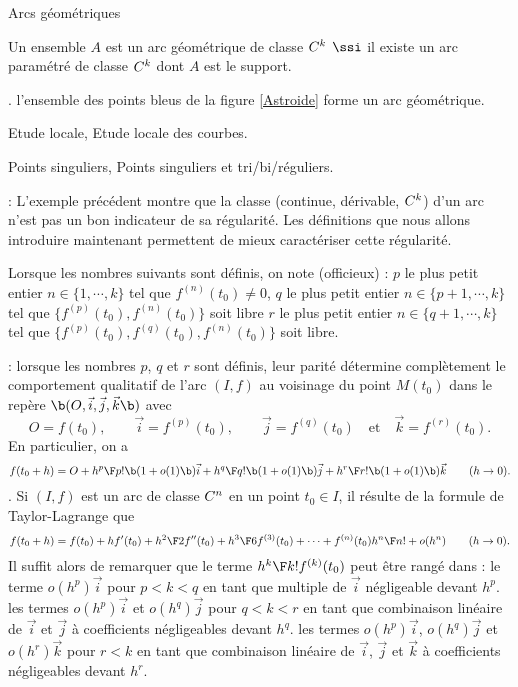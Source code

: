 \Concept Arcs g\'eom\'etriques

Un ensemble $A$ est un arc g\'eom\'etrique de classe $\sc C^k$ $\ssi$ il existe un arc param\'etr\'e de classe $\sc C^k$ dont $A$ est le support. 
\bigskip

\Exemple. l'ensemble des points bleus de la figure \ref{Astroide} forme un arc g\'eom\'etrique. 

\Section Etude locale, Etude locale des courbes. 

\Subsection Points singuliers, Points singuliers et tri/bi/r\'eguliers.

\Remarque : L'exemple pr\'ec\'edent montre que la classe (continue, d\'erivable, $\sc C^k$) d'un arc n'est pas un bon indicateur de sa r\'egularit\'e. 
Les d\'efinitions que nous allons introduire maintenant permettent de mieux caract\'eriser cette r\'egularit\'e. 
\bigskip

Lorsque les nombres suivants sont d\'efinis, on note (officieux) : \medskip\noindent
$p$ le plus petit entier $n\in\{1,\cdots, k\}$ tel que $f^{(n)}(t_0)\neq 0$, 
\medskip
\noindent 
$q$ le plus petit entier $n\in\{p+1,\cdots,k\}$ tel que $\{f^{(p)}(t_0),f^{(n)}(t_0)\}$ soit libre 
\medskip
\noindent 
$r$ le plus petit entier $n\in\{q+1,\cdots,k\}$ tel que $\{f^{(p)}(t_0),f^{(q)}(t_0),f^{(n)}(t_0)\}$ soit libre. 

\Remarque : lorsque les nombres $p$, $q$ et $r$ sont d\'efinis, leur parit\'e d\'etermine compl\`etement le comportement qualitatif de l'arc $(I,f)$ au voisinage du point $M(t_0)$ dans le rep\`ere $\b(O,\vec i,\vec j,\vec k\b)$ avec 
$$ 
O=f(t_0), \qquad \vec i=f^{(p)}(t_0), \qquad\vec j=f^{(q)}(t_0)\quad\mbox{et}\quad\vec k=f^{(r)}(t_0).
$$ 
En particulier, on a 
$$
f(t_0+h)=O+{h^p\F p!}\b(1+o(1)\b)\vec i+{h^q\F q!}\b(1+o(1)\b)\vec j
+{h^r\F r!}\b(1+o(1)\b)\vec k\qquad(h\to0).
$$ 
\Demonstration. Si $(I,f)$ est un arc de classe $\sc C^n$ en un point $t_0\in I$, il r\'esulte de la formule de Taylor-Lagrange que 
$$
f(t_0+h)=f(t_0)+hf'(t_0)+{h^2\F2}f''(t_0)+{h^3\F6}f^{(3)}(t_0)+\cdots+f^{(n)}(t_0){h^n\F n!}+o(h^n)\qquad(h\to0). 
$$
Il suffit alors de remarquer que le terme ${h^k\F k!}f^{(k)}(t_0)$ peut \^etre rang\'e dans : \smallskip\noindent
le terme $o(h^p)\vec i$ pour $p<k<q$ en tant que multiple de $\vec i$ n\'egligeable devant $h^p$. \smallskip\noindent
les termes $o(h^p)\vec i$ et $o(h^q)\vec j$ pour $q<k<r$ en tant que combinaison lin\'eaire de $\vec i$ et $\vec j$ \`a coefficients n\'egligeables devant $h^q$. \smallskip\noindent
les termes $o(h^p)\vec i$, $o(h^q)\vec j$ et $o(h^r)\vec k$ pour $r<k$ en tant que combinaison lin\'eaire de $\vec i$, $\vec j$ et $\vec k$ \`a coefficients n\'egligeables devant $h^r$. 
\CQFD

